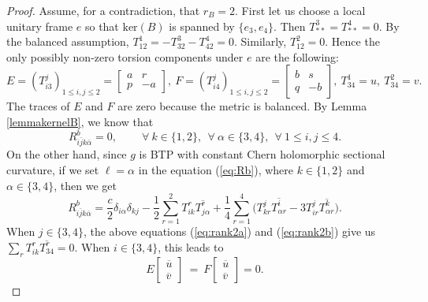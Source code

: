\documentclass{amsart}
\begin{document}
\begin{proof}
Assume, for a contradiction, that $r_B=2$. First let us choose a local unitary frame $e$ so that $\mbox{ker}(B)$ is spanned by $\{ e_3, e_4\}$. Then $T^3_{\ast \ast} = T^4_{\ast \ast}=0$. By the balanced assumption, $T^1_{12}=-T^3_{32}-T^4_{42}=0$. Similarly, $T^2_{12}=0$. Hence the only possibly non-zero torsion components under $e$ are the following:
\begin{equation} \label{eq:rank2}
E = (T^j_{i3})_{1\leq i,j\leq 2} = \left[ \begin{array}{cc} a & r\\p& -a \end{array} \right] , \ F = (T^j_{i4})_{1\leq i,j\leq 2} = \left[ \begin{array}{cc} b & s\\q& -b \end{array} \right],\ T^1_{34}=u, \ T^2_{34}=v.
\end{equation}
The traces of $E$ and $F$ are zero because the metric is balanced. By Lemma \ref{lemmakernelB}, we know that
\begin{equation} \label{eq:rank2a}
R^{b}_{i\bar{j}k\bar{\alpha}} =0,  \ \ \ \ \ \ \ \ \ \ \forall \ k\in \{ 1,2\}, \ \ \forall \ \alpha \in \{ 3,4\}, \ \  \forall \ 1\leq i,j \leq 4.
\end{equation}
On the other hand, since $g$ is BTP with constant Chern holomorphic sectional curvature, if we set \(\ell=\alpha\) in the equation (\ref{eq:Rb}), where \(k\in\{1,2\}\) and \(\alpha\in\{3,4\}\), then we get
\begin{equation} \label{eq:rank2b}
R^{b}_{i\bar{j}k\bar{\alpha}} = \frac{c}{2} \delta_{i\alpha} \delta_{kj} -\frac{1}{2} \sum_{r=1}^2 T^r_{ik}\overline{T^r_{j\alpha}}  + \frac{1}{4} \sum_{r=1}^4 \big( T^j_{kr}\overline{T^i_{\alpha r}} - 3 T^j_{ir}\overline{T^k_{\alpha r}} \big).
\end{equation}
When $j\in \{ 3,4\}$, the above equations (\ref{eq:rank2a}) and (\ref{eq:rank2b}) give us $\sum_r T^r_{ik} \overline{T^r_{34}} =0$. When $i\in \{ 3,4\}$, this leads to
\begin{equation}  \label{eq:rank2-1}
 E \left[ \begin{array}{c} \overline{u} \\ \overline{v} \end{array} \right] \ = \  F \left[ \begin{array}{c} \overline{u} \\ \overline{v} \end{array} \right]  = 0.

\end{equation}
\end{proof}
\end{document}
